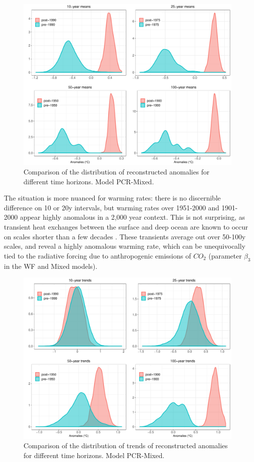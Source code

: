 \documentclass[12pt]{amsart}
\theoremstyle{plain}
\theoremstyle{definition}
\theoremstyle{remark}
\begin{document}
\begin{figure}
  \centering
  \includegraphics[scale=0.35]{compMeans}
  \caption{Comparison of the distribution of reconstructed anomalies for different time horizons. Model PCR-Mixed. }
  \label{fig:compmeans}
\end{figure}

The situation is more nuanced for warming rates: there is no discernible difference on 10 or 20y intervals, but warming rates over 1951-2000 and 1901-2000 appear highly anomalous in a 2,000 year context. This is not surprising, as transient heat exchanges between the surface and deep ocean are known to occur on scales shorter than a few decades \citep{Hansen:2005}. These transients average out over 50-100y scales, and reveal a highly anomalous warming rate, which can be unequivocally tied to the radiative forcing due to anthropogenic emissions of $CO_2$ (parameter $\beta_3$ in the WF and Mixed models).

\begin{figure}
  \centering
  \includegraphics[scale=0.35]{compTrends}
  \caption{Comparison of the distribution of trends of reconstructed anomalies for different time horizons. Model PCR-Mixed.}
  \label{fig:comptrends}
\end{figure}
\end{document}
